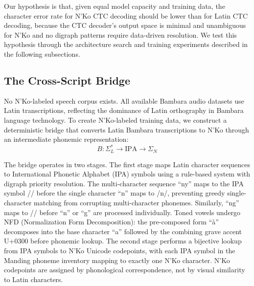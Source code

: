 \documentclass[11pt]{article}
\newcommand{\nko}{N'Ko}
\begin{document}
Our hypothesis is that, given equal model capacity and training data, the character error rate for \nko{} CTC decoding should be lower than for Latin CTC decoding, because the CTC decoder's output space is minimal and unambiguous for \nko{} and no digraph patterns require data-driven resolution. We test this hypothesis through the architecture search and training experiments described in the following subsections.

\subsection{The Cross-Script Bridge}
\label{sec:bridge}

No \nko{}-labeled speech corpus exists. All available Bambara audio datasets use Latin transcriptions, reflecting the dominance of Latin orthography in Bambara language technology. To create \nko{}-labeled training data, we construct a deterministic bridge that converts Latin Bambara transcriptions to \nko{} through an intermediate phonemic representation:
\begin{equation}
B: \Sigma_L^* \to \text{IPA} \to \Sigma_N
\label{eq:bridge}
\end{equation}

The bridge operates in two stages. The first stage maps Latin character sequences to International Phonetic Alphabet (IPA) symbols using a rule-based system with digraph priority resolution. The multi-character sequence ``ny'' maps to the IPA symbol // before the single character ``n'' maps to /n/, preventing greedy single-character matching from corrupting multi-character phonemes. Similarly, ``ng'' maps to // before ``n'' or ``g'' are processed individually. Toned vowels undergo NFD (Normalization Form Decomposition): the pre-composed form ``\`a'' decomposes into the base character ``a'' followed by the combining grave accent U+0300 before phonemic lookup. The second stage performs a bijective lookup from IPA symbols to \nko{} Unicode codepoints, with each IPA symbol in the Manding phoneme inventory mapping to exactly one \nko{} character. \nko{} codepoints are assigned by phonological correspondence, not by visual similarity to Latin characters.
\end{document}
